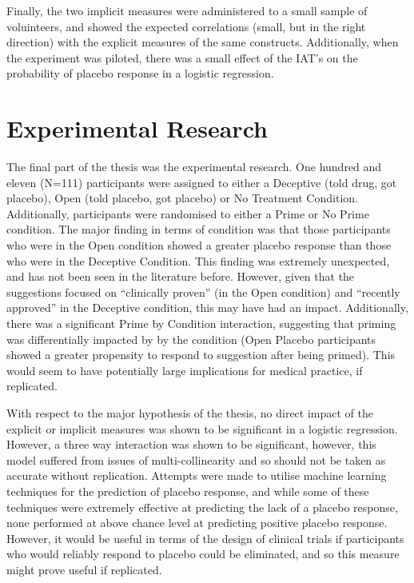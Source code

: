 Finally, the two implicit measures were administered to a small sample of voluinteers, and showed the expected correlations (small, but in the right direction) with the explicit measures of the same constructs. Additionally, when the experiment was piloted, there was a small effect of the IAT's on the probability of placebo response in a logistic regression. 

\section{Experimental Research}
\label{sec:exper-rese}

The final part of the thesis was the experimental research. One hundred and eleven (N=111) participants were assigned to either a Deceptive (told drug, got placebo), Open (told placebo, got placebo) or No Treatment Condition. Additionally, participants were randomised to either a Prime or No Prime condition. The major finding in terms of condition was that those participants who were in the Open condition showed a greater placebo response than those who were in the Deceptive Condition. This finding was extremely unexpected, and has not been seen in the literature before. However, given that the suggestions focused on ``clinically proven'' (in the Open condition) and ``recently approved'' in the Deceptive condition, this may have had an impact. Additionally, there was a significant Prime by Condition interaction, suggesting that priming was differentially impacted by by the condition (Open Placebo participants showed a greater propensity to respond to suggestion after being primed). This would seem to have potentially large implications for medical practice, if replicated. 

With respect to the major hypothesis of the thesis, no direct impact of the explicit or implicit measures was shown to be significant in a logistic regression. However, a three way interaction was shown to be significant, however, this model suffered from issues of multi-collinearity and so should not be taken as accurate without replication. Attempts were made to utilise machine learning techniques for the prediction of placebo response, and while some of these techniques were extremely effective at predicting the lack of a placebo response, none performed at above chance level at predicting positive placebo response. However, it would be useful in terms of the design of clinical trials if participants who would reliably respond to placebo could be eliminated, and so this measure might prove useful if replicated. 

